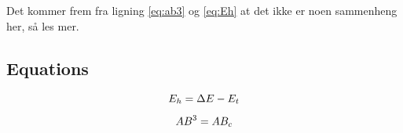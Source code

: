 \pagebreak
\section{\theorysec}

Det kommer frem fra ligning \ref{eq:ab3} og \ref{eq:Eh} at det ikke er noen sammenheng her, så les mer.

\subsection{Equations}
\begin{equation}[H]
    E_h = \Delta E - E_t\\
    \label{eq:Eh}
\end{equation}

\begin{equation}
    AB^3 = AB_c\\
    \label{eq:ab3}
\end{equation}